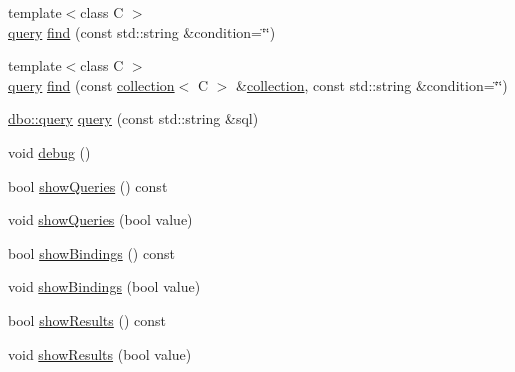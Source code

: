\begin{DoxyCompactItemize}
\item 
{\footnotesize template$<$class C $>$ }\\\hyperlink{classdbo_1_1query}{query} \hyperlink{classdbo_1_1connection_add07b767b4b22afb986babf8dd899b65}{find} (const std\+::string \&condition=\char`\"{}\char`\"{})
\item 
{\footnotesize template$<$class C $>$ }\\\hyperlink{classdbo_1_1query}{query} \hyperlink{classdbo_1_1connection_a77a4ae27ad8ead0540ecb777f75bd019}{find} (const \hyperlink{classdbo_1_1collection}{collection}$<$ C $>$ \&\hyperlink{classdbo_1_1collection}{collection}, const std\+::string \&condition=\char`\"{}\char`\"{})
\item 
\hyperlink{classdbo_1_1query}{dbo\+::query} \hyperlink{classdbo_1_1connection_acdfefa09f01c05245667a982997ebbf3}{query} (const std\+::string \&sql)
\item 
void \hyperlink{classdbo_1_1connection_a69fbd222607d92d26f4982372a983e9e}{debug} ()
\item 
bool \hyperlink{classdbo_1_1connection_ac7e8bf86476f50eb3206b02c2d630b57}{show\+Queries} () const 
\item 
void \hyperlink{classdbo_1_1connection_a7fc0f5d76e19b92fb2d496ce28f033e9}{show\+Queries} (bool value)
\item 
bool \hyperlink{classdbo_1_1connection_ae869e5469a63b2db3e4b8eddf182d62b}{show\+Bindings} () const 
\item 
void \hyperlink{classdbo_1_1connection_acf2c95c516bce9b9086b69498bff4515}{show\+Bindings} (bool value)
\item 
bool \hyperlink{classdbo_1_1connection_a56fb518379af8d6930c15fb00390b80d}{show\+Results} () const 
\item 
void \hyperlink{classdbo_1_1connection_ad976083297b76e9ccd62e88fb4e79e7e}{show\+Results} (bool value)
\end{DoxyCompactItemize}
